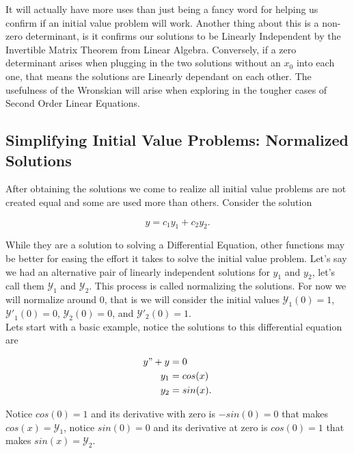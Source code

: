 \documentclass[12pt]{article}
\begin{document}
It will actually have more uses than just being a fancy word for helping us confirm if an initial value problem will work. Another thing about this is a non-zero determinant, is it confirms our solutions to be Linearly Independent by the Invertible Matrix Theorem from Linear Algebra. Conversely, if a zero determinant arises when plugging in the two solutions without an $x_0$ into each one, that means the solutions are Linearly dependant on each other. The usefulness of the Wronskian will arise when exploring in the tougher cases of Second Order Linear Equations.

\pagebreak

\subsection{Simplifying Initial Value Problems: Normalized Solutions}

After obtaining the solutions we come to realize all initial value problems are not created equal and some are used more than others. Consider the solution

\begin{equation*}
    y=c_1y_1+c_2y_2.
\end{equation*}

While they are a solution to solving a Differential Equation, other functions may be better for easing the effort it takes to solve the initial value problem. Let's say we had an alternative pair of linearly independent solutions for $y_1$ and $y_2$, let's call them $\mathcal{Y}_1$ and $\mathcal{Y}_2$. This process is called normalizing the solutions. For now we will normalize around $0$, that is we will consider the initial values $\mathcal{Y}_1(0)=1$, $\mathcal{Y'}_1(0)=0$, $\mathcal{Y}_2(0)=0$, and $\mathcal{Y}'_2(0)=1$. \\

Lets start with a basic example, notice the solutions to this differential equation are

\begin{align*}
    y"+y &= 0 \\
    y_1 &= cos(x) \\
    y_2 &= sin(x).
\end{align*}

Notice $cos(0)=1$ and its derivative with zero is $-sin(0)=0$ that makes $cos(x)=\mathcal{Y}_1$, notice $sin(0)=0$ and its derivative at zero is $cos(0)=1$ that makes $sin(x)=\mathcal{Y}_2$. \\
\end{document}

